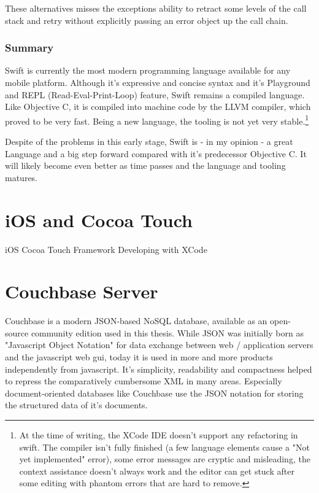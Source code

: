 These alternatives misses the exceptions ability to retract some levels of the call stack and retry without explicitly passing an error object up the call chain.

\subsubsection{Summary}

Swift is currently the most modern programming language available for any mobile platform. Although it's expressive and concise syntax and it's Playground and REPL (Read-Eval-Print-Loop) feature, Swift remains a compiled language. Like Objective C, it is compiled into machine code by the LLVM compiler, which proved to be very fast. Being a new language, the tooling is not yet very stable.\footnote{At the time of writing, the XCode IDE doesn't support any refactoring in swift. The compiler isn't fully finished (a few language elements cause a "Not yet implemented" error), some error messages are cryptic and misleading, the context assistance doesn't always work and the editor can get stuck after some editing with phantom errors that are hard to remove.}

Despite of the problems in this early stage, Swift is - in my opinion - a great Language and a big step forward compared with it's predecessor Objective C. It will likely become even better as time passes and the language and tooling matures. 


\section{iOS and Cocoa Touch}

iOS Cocoa Touch Framework 
Developing with XCode

\section{Couchbase Server}

Couchbase\cite{Internet-couchbase} is a modern JSON-based NoSQL database, available as an open-source community edition used in this thesis. While JSON was initially born as "Javascript Object Notation" for data exchange between web / application servers and the javascript web gui, today it is used in more and more products independently from javascript. It's simplicity, readability and compactness helped to repress the comparatively cumbersome XML in many areas. Especially document-oriented databases like Couchbase use the JSON notation for storing the structured data of it's documents.

